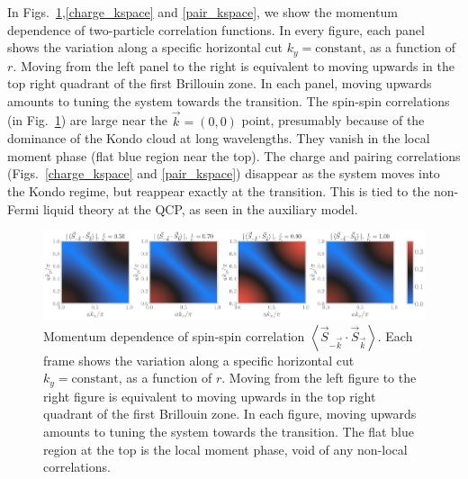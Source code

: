 \documentclass[reprint,hidelinks]{revtex4-2}
\begin{document}
\begin{widetext}
In Figs.~\ref{spin_kspace},\ref{charge_kspace} and \ref{pair_kspace}, we show the momentum dependence of two-particle correlation functions. In every figure, each panel shows the variation along a specific horizontal cut \(k_y=\text{constant}\), as a function of \(r\). Moving from the left panel to the right is equivalent to moving upwards in the top right quadrant of the first Brillouin zone. In each panel, moving upwards amounts to tuning the system towards the transition. The spin-spin correlations (in Fig.~\ref{spin_kspace}) are large near the \(\vec k = \left( 0,0 \right) \) point, presumably because of the dominance of the Kondo cloud at long wavelengths. They vanish in the local moment phase (flat blue region near the top). The charge and pairing correlations (Figs.~\ref{charge_kspace} and \ref{pair_kspace}) disappear as the system moves into the Kondo regime, but reappear exactly at the transition. This is tied to the non-Fermi liquid theory at the QCP, as seen in the auxiliary model.
\begin{figure}[!htb]
\centering
\includegraphics[width=\textwidth]{spin_rspace_all.pdf}
\caption{Momentum dependence of spin-spin correlation \(\left<\vec{S}_{-\vec k}\cdot\vec{S}_{\vec k} \right>\). Each frame shows the variation along a specific horizontal cut \(k_y=\text{constant}\), as a function of \(r\). Moving from the left figure to the right figure is equivalent to moving upwards in the top right quadrant of the first Brillouin zone. In each figure, moving upwards amounts to tuning the system towards the transition. The flat blue region at the top is the local moment phase, void of any non-local correlations.}
\label{spin_kspace}
\end{figure}


\end{widetext}
\end{document}
